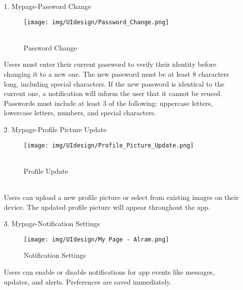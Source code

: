\documentclass[conference]{IEEEtran}
\begin{document}
\begin{enumerate}
    \item[1.] Mypage-Password Change
    \begin{figure}[h]
\hspace{1.5cm}
\centering
\begin{minipage}{0.4\columnwidth}
    \texttt{[image: img/UIdesign/Password\_Change.png]}
    \caption{ \\ Password Change}
\end{minipage}
\end{figure}

    Users must enter their current password to verify their identity before changing it to a new one. The new password must be at least 8 characters long, including special characters. If the new password is identical to the current one, a notification will inform the user that it cannot be reused. Passwords must include at least 3 of the following: uppercase letters, lowercase letters, numbers, and special characters. \\
\end{enumerate}

\begin{enumerate}
    \item[2.] Mypage-Profile Picture Update
    \begin{figure}[h]
\hspace{1.5cm}
\centering
\begin{minipage}{0.4\columnwidth}
    \texttt{[image: img/UIdesign/Profile\_Picture\_Update.png]}
    \caption{\\ Profile Update}
\end{minipage}
\end{figure} \\

    Users can upload a new profile picture or select from existing images on their device. The updated profile picture will appear throughout the app. \\
\end{enumerate}

\begin{enumerate}
    \item[3.] Mypage-Notification Settings
    \begin{figure}[h]
\hspace{1.5cm}
\centering
\begin{minipage}{0.4\columnwidth}
    \texttt{[image: img/UIdesign/My Page - Alram.png]}
    \caption{Notification Settings}
\end{minipage}
\end{figure} 

    Users can enable or disable notifications for app events like messages, updates, and alerts. Preferences are saved immediately. \\ 
\end{enumerate}
\end{document}
